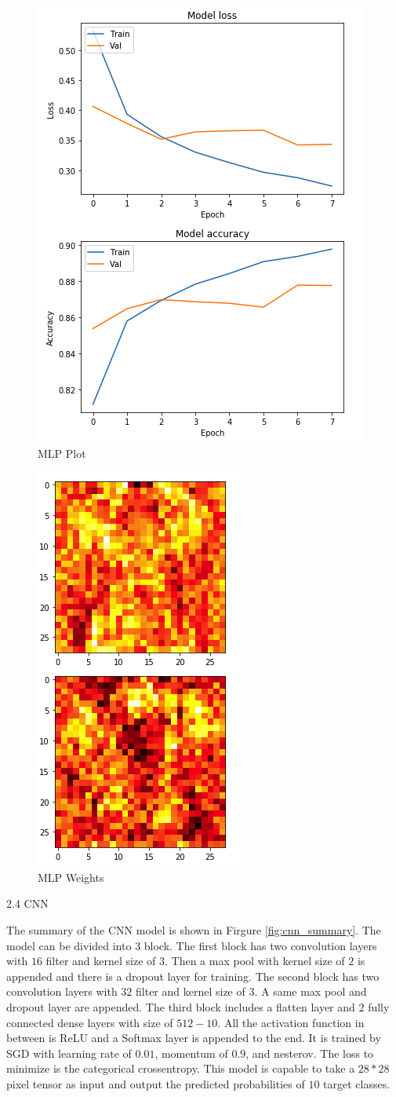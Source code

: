 \documentclass[11pt]{article}
\begin{document}
\begin{enumerate}
\begin{figure}[!h]
  \centering
  \includegraphics[width=0.4\linewidth]{figures/mlp/plot.png}
  \caption{MLP Plot}
  \label{fig:mlp_plot}
\end{figure}

\begin{figure}[!h]
  \centering
  \includegraphics[width=0.4\linewidth]{figures/mlp/weights.png}
  \caption{MLP Weights}
  \label{fig:mlp_weights}
\end{figure}

2.4 CNN
\medskip


The summary of the CNN model is shown in Firgure \ref{fig:cnn_summary}. The model can be divided into $3$ block. The first block has two convolution layers with $16$ filter and kernel size of $3$. Then a max pool with kernel size of $2$ is appended and there is a dropout layer for training. The second block has two convolution layers with $32$ filter and kernel size of $3$. A same max pool and dropout layer are appended. The third block includes a flatten layer and $2$ fully connected dense layers with size of $512-10$. All the activation function in between is ReLU and a Softmax layer is appended to the end. It is trained by SGD with learning rate of $0.01$, momentum of $0.9$, and nesterov. The loss to minimize is the categorical crossentropy. This model is capable to take a $28*28$ pixel tensor as input and output the predicted probabilities of $10$ target classes.


\end{enumerate}
\end{document}
